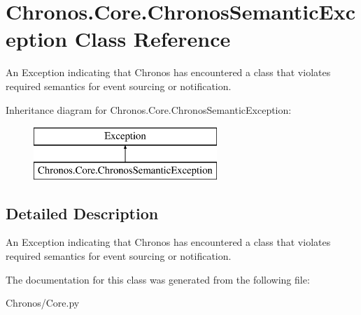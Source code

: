 \hypertarget{classChronos_1_1Core_1_1ChronosSemanticException}{}\section{Chronos.\+Core.\+Chronos\+Semantic\+Exception Class Reference}
\label{classChronos_1_1Core_1_1ChronosSemanticException}


An Exception indicating that Chronos has encountered a class that violates required semantics for event sourcing or notification.  


Inheritance diagram for Chronos.\+Core.\+Chronos\+Semantic\+Exception\+:\begin{figure}[H]
\begin{center}
\leavevmode
\includegraphics[height=2.000000cm]{classChronos_1_1Core_1_1ChronosSemanticException}
\end{center}
\end{figure}


\subsection{Detailed Description}
An Exception indicating that Chronos has encountered a class that violates required semantics for event sourcing or notification. 



The documentation for this class was generated from the following file\+:\begin{DoxyCompactItemize}
\item 
Chronos/Core.\+py\end{DoxyCompactItemize}
